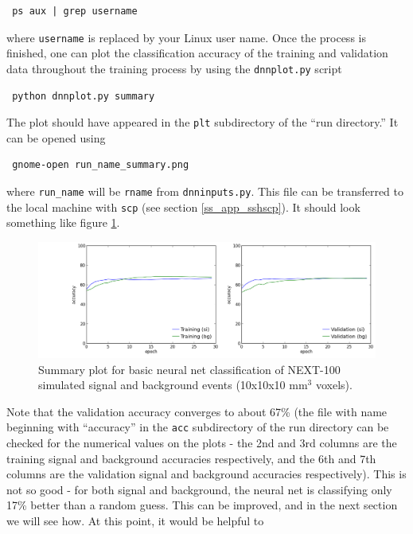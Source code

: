 \documentclass[10pt]{article}
\begin{document}
\begin{verbatim}
 ps aux | grep username
\end{verbatim}

\noindent where \verb|username| is replaced by your Linux user name.  Once the process is finished, one can plot the classification
accuracy of the training and validation data throughout the training process by using the \verb|dnnplot.py| script

\begin{verbatim}
 python dnnplot.py summary
\end{verbatim}

\noindent The plot should have appeared in the \verb|plt| subdirectory of the ``run directory.''  It can be opened using 

\begin{verbatim}
 gnome-open run_name_summary.png
\end{verbatim}

\noindent where \verb|run_name| will be \verb|rname| from \verb|dnninputs.py|.  This file can be transferred to the local machine
with \verb|scp| (see section \ref{ss_app_sshscp}).  It should look something like figure \ref{fig_basicsummary}.\\

\begin{figure}[!ht]
	\centering
	\includegraphics[scale=0.425]{fig/dnn3d_NEXT100_Paolina222_v10x10x10_r200x200x200_basic_summary.png}
	\caption{\label{fig_basicsummary}Summary plot for basic neural net classification of NEXT-100 simulated signal and background events (10x10x10 mm$^3$ voxels).}
\end{figure}

\noindent Note that the validation accuracy converges to about 67\% (the file with name beginning with ``accuracy'' in the \verb|acc| subdirectory of the run directory can be checked for the 
numerical values on the plots - the 2nd and 3rd columns are the training signal and background accuracies respectively, and the 6th and 7th columns are the validation signal and background
accuracies respectively).  This is not so good - for both signal and background, the neural net is classifying only 17\% better than a random guess.  This can be improved, and in the next
section we will see how.  At this point, it would be helpful to
\end{document}
